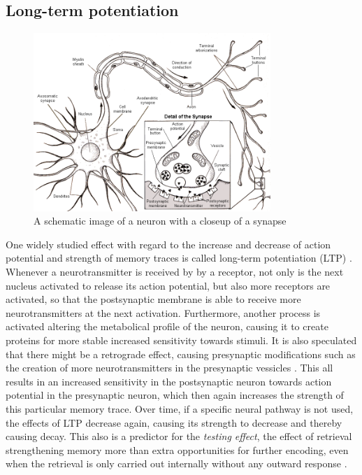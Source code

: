 \subsection{Long-term potentiation}
\label{subsec:interferencedecay}

\begin{figure}
    \centering
    \includegraphics[width=0.8\textwidth]{img/neuron.png}
    \caption{A schematic image of a neuron with a closeup of a synapse \protect\cite{website:neuron}}
    \label{fig:neuron}
\end{figure}

One widely studied effect with regard to the increase and decrease of action potential and strength of memory traces is called long-term potentiation (LTP) \cite{cognitivepsychology, longtermpotentiation, activationbasedmodel, amnesia}. Whenever a neurotransmitter is received by by a receptor, not only is the next nucleus activated to release its action potential, but also more receptors are activated, so that the postsynaptic membrane is able to receive more neurotransmitters at the next activation. Furthermore, another process is activated altering the metabolical profile of the neuron, causing it to create proteins for more stable increased sensitivity towards stimuli. It is also speculated that there might be a retrograde effect, causing presynaptic modifications such as the creation of more neurotransmitters in the presynaptic vessicles \cite{longtermpotentiation}. This all results in an increased sensitivity in the postsynaptic neuron towards action potential in the presynaptic neuron, which then again increases the strength of this particular memory trace. Over time, if a specific neural pathway is not used, the effects of LTP decrease again, causing its strength to decrease and thereby causing decay. This also is a predictor for the \emph{testing effect}, the effect of retrieval strengthening memory more than extra opportunities for further encoding, even when the retrieval is only carried out internally without any outward response \cite{microlearning}.

